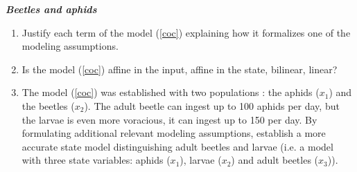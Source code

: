 \begin{exercice}{\bf \em Beetles and aphids}

\begin{enumerate}
\item Justify each term of the model (\ref{coc}) explaining how it formalizes one of the modeling assumptions.
\item Is the model (\ref{coc}) affine in the input, affine in the state, bilinear, linear? 
\item The model (\ref{coc}) was established with two populations : the aphids ($x_1$) and the beetles ($x_2$). The adult beetle can ingest up to 100 aphids per day, but the larvae is even more voracious, it can ingest up to 150 per day. By formulating additional relevant modeling assumptions, establish a more accurate state model distinguishing adult beetles and larvae (i.e. a model with three state variables: aphids ($x_1$), larvae ($x_2$) and adult beetles ($x_3$)).
\end{enumerate}
\end{exercice}




